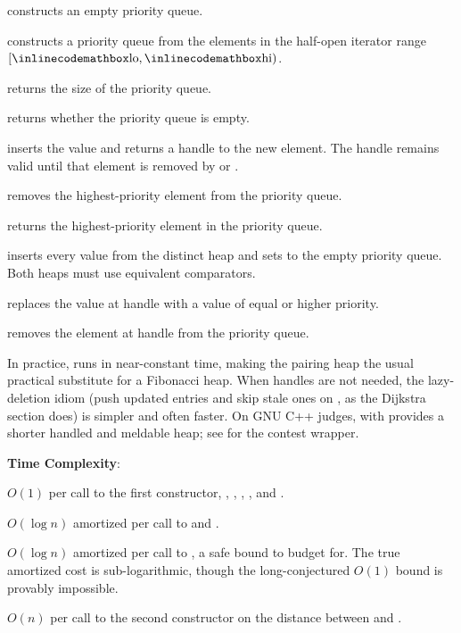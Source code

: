 \begin{compactitem}
  \item {} constructs an empty priority queue.
  \item {} constructs a priority queue from the elements in the half-open iterator range $[{\inlinecodemath{lo}}, {\inlinecodemath{hi}})$.
  \item {} returns the size of the priority queue.
  \item {} returns whether the priority queue is empty.
  \item {} inserts the value  and returns a handle to the new element. The handle remains valid until that element is removed by  or .
  \item {} removes the highest-priority element from the priority queue.
  \item {} returns the highest-priority element in the priority queue.
  \item {} inserts every value from the distinct heap  and sets  to the empty priority queue. Both heaps must use equivalent comparators.
  \item {} replaces the value at handle  with a value  of equal or higher priority.
  \item {} removes the element at handle  from the priority queue.
\end{compactitem}

In practice,  runs in near-constant time, making the pairing heap the usual practical substitute for a Fibonacci heap. When handles are not needed, the lazy-deletion idiom (push updated entries and skip stale ones on , as the Dijkstra section does) is simpler and often faster. On GNU C++ judges,  with  provides a shorter handled and meldable heap; see  for the contest wrapper.

\textbf{Time Complexity}:
\begin{compactitem}
  \item $O(1)$ per call to the first constructor, , , , , and .
  \item $O(\log n)$ amortized per call to  and .
  \item $O(\log n)$ amortized per call to , a safe bound to budget for. The true amortized cost is sub-logarithmic, though the long-conjectured $O(1)$ bound is provably impossible.
  \item $O(n)$ per call to the second constructor on the distance between  and .
\end{compactitem}

